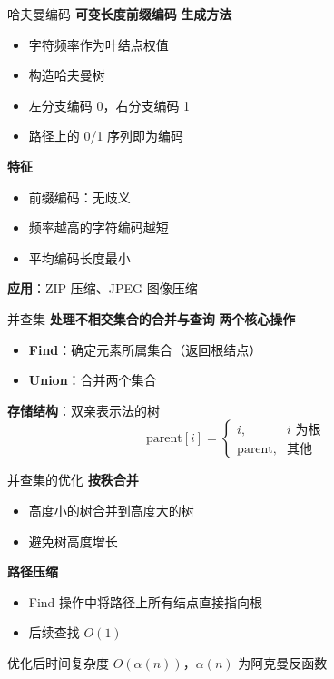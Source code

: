 \documentclass[10pt, aspectratio=169]{beamer}
\begin{document}
\begin{frame}{哈夫曼编码}
    \textbf{可变长度前缀编码}
    \vspace{0.3em}
    \textbf{生成方法}
    \begin{itemize}
        \item 字符频率作为叶结点权值
        \item 构造哈夫曼树
        \item 左分支编码 0，右分支编码 1
        \item 路径上的 0/1 序列即为编码
    \end{itemize}
    \vspace{0.3em}
    \textbf{特征}
    \begin{itemize}
        \item 前缀编码：无歧义
        \item 频率越高的字符编码越短
        \item 平均编码长度最小
    \end{itemize}
    \vspace{0.3em}
    \textbf{应用}：ZIP 压缩、JPEG 图像压缩
\end{frame}

\begin{frame}{并查集}
    \textbf{处理不相交集合的合并与查询}
    \vspace{0.3em}
    \textbf{两个核心操作}
    \begin{itemize}
        \item \textbf{Find}：确定元素所属集合（返回根结点）
        \item \textbf{Union}：合并两个集合
    \end{itemize}
    \vspace{0.3em}
    \textbf{存储结构}：双亲表示法的树
    \[
    \text{parent}[i] = 
    \begin{cases}
    i, & i \text{ 为根}\\
    \text{parent}, & \text{其他}
    \end{cases}
    \]
\end{frame}

\begin{frame}{并查集的优化}
    \textbf{按秩合并}
    \begin{itemize}
        \item 高度小的树合并到高度大的树
        \item 避免树高度增长
    \end{itemize}
    \vspace{0.3em}
    \textbf{路径压缩}
    \begin{itemize}
        \item Find 操作中将路径上所有结点直接指向根
        \item 后续查找 $O(1)$
    \end{itemize}
    \vspace{0.3em}
    优化后时间复杂度 $O(\alpha(n))$，$\alpha(n)$ 为阿克曼反函数
\end{frame}
\end{document}
